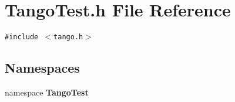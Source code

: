 \section{Tango\-Test.h File Reference}
\label{TangoTest_8h}
{\tt \#include $<$tango.h$>$}\par
\subsection*{Namespaces}
\begin{CompactItemize}
\item 
namespace {\bf Tango\-Test}
\end{CompactItemize}
